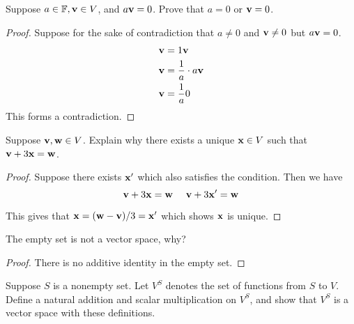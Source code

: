 \documentclass{extarticle}
\begin{document}
\begin{problem}{2}
    Suppose \(a \in \mathbb{F}, \mathbf{v} \in V\), and \(a \mathbf{v} = 0\). Prove that \(a = 0\)
    or \(\mathbf{v} = 0\). 
\end{problem}

\begin{proof}
Suppose for the sake of contradiction that \(a \neq 0\) and \(\mathbf{v} \neq 0\) but 
\(a \mathbf{v} = 0\).  
\begin{align*}
   \mathbf{v} &= 1 \mathbf{v} \\ 
   \mathbf{v} &= \frac{1}{a} \cdot a \mathbf{v} \\ 
   \mathbf{v} &= \frac{1}{a} 0  
\end{align*}
This forms a contradiction. 
\end{proof}

\begin{problem}{3}
    Suppose \(\mathbf{v}, \mathbf{w} \in V\). Explain why there exists a unique \(\mathbf{x} \in V\) such 
    that \(\mathbf{v} + 3\mathbf{x} = \mathbf{w}\). 
\end{problem}

\begin{proof}
Suppose there exists \(\mathbf{x}'\) which also satisfies the condition. Then we have
\begin{equation}
    \mathbf{v} + 3\mathbf{x} = \mathbf{w} \ \  \ \ \mathbf{v} + 3 \mathbf{x}' = \mathbf{w} 
\end{equation}

This gives that \(\mathbf{x} = (\mathbf{w} - \mathbf{v}) / 3 = \mathbf{x}'\) which shows \(\mathbf{x}\) is unique. 
\end{proof}

\begin{problem}{4}
    The empty set is not a vector space, why? 
\end{problem}

\begin{proof}
There is no additive identity in the empty set. 
\end{proof}

\begin{problem}{7}
    Suppose \(S\) is a nonempty set. Let \(V^S\) denotes the set of functions from \(S\)
    to \(V\). Define a natural addition and scalar multiplication on \(V^S\), and show 
    that \(V^S\) is a vector space with these definitions. 
\end{problem}
\end{document}
